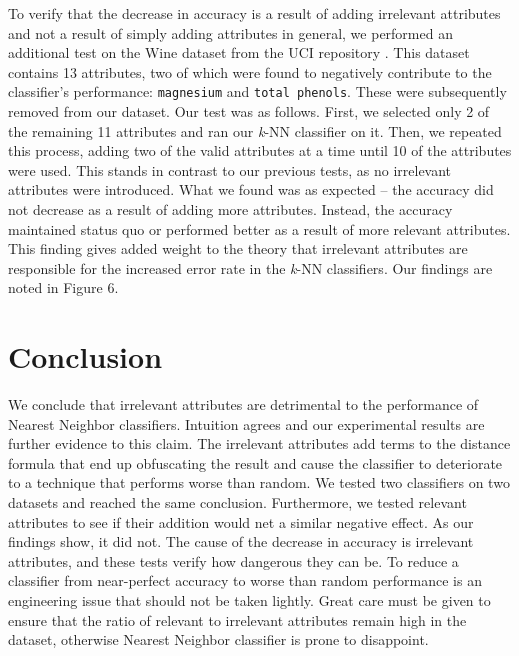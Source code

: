\documentclass{article}
\begin{document}
To verify that the decrease in accuracy is a result of adding irrelevant attributes and not a result of simply adding attributes in general, we performed an additional test on the Wine dataset from the UCI repository \cite{wine}. This dataset contains 13 attributes, two of which were found to negatively contribute to
the classifier's performance: \texttt{magnesium} and \texttt{total phenols}. These were subsequently removed from our dataset. Our test was as follows. First, we selected only 2 of the remaining 11 attributes and ran our \textit{k}-NN classifier on it. Then, we repeated this process, adding two of the valid attributes at a time until 10 of the attributes were used. This stands in contrast to our previous tests, as no irrelevant attributes were introduced. What we found was as expected -- the accuracy did not decrease as a result of adding more attributes. Instead, the accuracy maintained status quo or performed better as a result of more relevant attributes. This finding gives added weight to the theory that irrelevant attributes are responsible for the increased error rate in the \textit{k}-NN classifiers. Our findings are noted in Figure 6. 

\section{Conclusion}

We conclude that irrelevant attributes are detrimental to the performance of Nearest Neighbor classifiers. Intuition agrees and our experimental results are further evidence to this claim. The irrelevant attributes add terms to the distance formula that end up obfuscating the result and cause the classifier to deteriorate to a technique that performs worse than random. We tested two classifiers on two datasets and reached the same conclusion. Furthermore, we tested relevant attributes to see if their addition would net a similar negative effect. As our findings show, it did not. The cause of the decrease in accuracy is irrelevant attributes, and these tests verify how dangerous they can be. To reduce a classifier from near-perfect accuracy to worse than random performance is an engineering issue that should not be taken lightly. Great care must be given to ensure that the ratio of relevant to irrelevant attributes remain high in the dataset, otherwise Nearest Neighbor classifier is prone to disappoint.  


 
\end{document}
